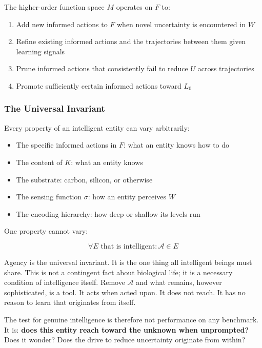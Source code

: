 \documentclass[
]{article}
\providecommand{\tightlist}{%
  \setlength{\itemsep}{0pt}\setlength{\parskip}{0pt}}
\begin{document}
The higher-order function space \(M\) operates on \(F\) to:

\begin{enumerate}
\def\labelenumi{\arabic{enumi}.}
\tightlist
\item
  Add new informed actions to \(F\) when novel uncertainty is
  encountered in \(W\)
\item
  Refine existing informed actions and the trajectories between them
  given learning signals
\item
  Prune informed actions that consistently fail to reduce \(U\) across
  trajectories
\item
  Promote sufficiently certain informed actions toward \(L_0\)
\end{enumerate}

\subsubsection{The Universal Invariant}\label{the-universal-invariant}

Every property of an intelligent entity can vary arbitrarily:

\begin{itemize}
\tightlist
\item
  The specific informed actions in \(F\): what an entity knows how to do
\item
  The content of \(K\): what an entity knows
\item
  The substrate: carbon, silicon, or otherwise
\item
  The sensing function \(\sigma\): how an entity perceives \(W\)
\item
  The encoding hierarchy: how deep or shallow its levels run
\end{itemize}

One property cannot vary:

\[\forall E \text{ that is intelligent}: \mathcal{A} \in E\]

Agency is the universal invariant. It is the one thing all intelligent
beings must share. This is not a contingent fact about biological life;
it is a necessary condition of intelligence itself. Remove
\(\mathcal{A}\) and what remains, however sophisticated, is a tool. It
acts when acted upon. It does not reach. It has no reason to learn that
originates from itself.

The test for genuine intelligence is therefore not performance on any
benchmark. It is: \textbf{does this entity reach toward the unknown when
unprompted?} Does it wonder? Does the drive to reduce uncertainty
originate from within?
\end{document}
